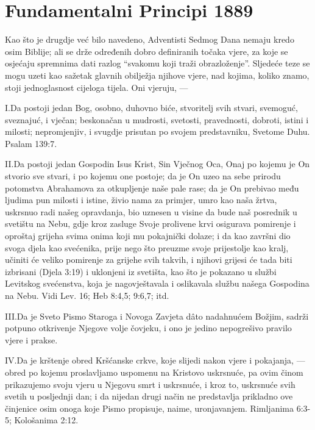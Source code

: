  \label{chap:appendix}


\section*{Fundamentalni Principi 1889}

Kao što je drugdje već bilo navedeno, Adventisti Sedmog Dana nemaju kredo osim Biblije; ali se drže određenih dobro definiranih točaka vjere, za koje se osjećaju spremnima dati razlog “svakomu koji traži obrazloženje”. Sljedeće teze se mogu uzeti kao sažetak glavnih obilježja njihove vjere, nad kojima, koliko znamo, stoji jednoglasnost cijeloga tijela. Oni vjeruju, —

\lettrine{I.} Da postoji jedan Bog, osobno, duhovno biće, stvoritelj svih stvari, svemoguć, sveznajuć, i vječan; beskonačan u mudrosti, svetosti, pravednosti, dobroti, istini i milosti; nepromjenjiv, i svugdje prisutan po svojem predstavniku, Svetome Duhu. Psalam 139:7.

\lettrine{II.} Da postoji jedan Gospodin Isus Krist, Sin Vječnog Oca, Onaj po kojemu je On stvorio sve stvari, i po kojemu one postoje; da je On uzeo na sebe prirodu potomstva Abrahamova za otkupljenje naše pale rase; da je On prebivao među ljudima pun milosti i istine, živio nama za primjer, umro kao naša žrtva, uskrsnuo radi našeg opravdanja, bio uznesen u visine da bude naš posrednik u svetištu na Nebu, gdje kroz zasluge Svoje prolivene krvi osigurava pomirenje i oproštaj grijeha svima onima koji mu pokajnički dolaze; i da kao završni dio svoga djela kao svećenika, prije nego što preuzme svoje prijestolje kao kralj, učiniti će veliko pomirenje za grijehe svih takvih, i njihovi grijesi će tada biti izbrisani (Djela 3:19) i uklonjeni iz svetišta, kao što je pokazano u službi Levitskog svećenstva, koja je nagovještavala i oslikavala službu našega Gospodina na Nebu. Vidi Lev. 16; Heb 8:4,5; 9:6,7; itd.

\lettrine{III.} Da je Sveto Pismo Staroga i Novoga Zavjeta dâto nadahnućem Božjim, sadrži potpuno otkrivenje Njegove volje čovjeku, i ono je jedino nepogrešivo pravilo vjere i prakse.

\lettrine{IV.} Da je krštenje obred Kršćanske crkve, koje slijedi nakon vjere i pokajanja, — obred po kojemu proslavljamo uspomenu na Kristovo uskrsnuće, pa ovim činom prikazujemo svoju vjeru u Njegovu smrt i uskrsnuće, i kroz to, uskrsnuće svih svetih u posljednji dan; i da nijedan drugi način ne predstavlja prikladno ove činjenice osim onoga koje Pismo propisuje, naime, uronjavanjem. Rimljanima 6:3-5; Kološanima 2:12.

